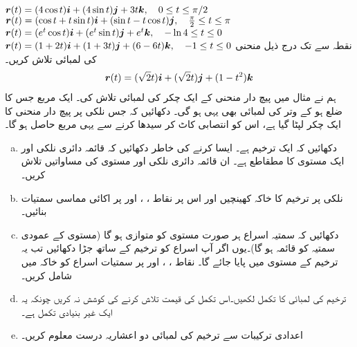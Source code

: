 ${{\boldsymbol{r}}}(t)=(4\cos t){\boldsymbol{i}}+(4\sin t){\boldsymbol{j}}+3t{\boldsymbol{k}},\quad 0\le t\le \pi/2$
${{\boldsymbol{r}}}(t)=(\cos t+t\sin t){\boldsymbol{i}}+(\sin t-t\cos t){\boldsymbol{j}},\quad \tfrac{\pi}{2}\le t\le \pi$
${{\boldsymbol{r}}}(t)=(e^t\cos t){\boldsymbol{i}}+(e^t\sin t){\boldsymbol{j}}+e^t{\boldsymbol{k}},\quad -\ln 4\le t\le 0$
${{\boldsymbol{r}}}(t)=(1+2t){\boldsymbol{i}}+(1+3t){\boldsymbol{j}}+(6-6t){\boldsymbol{k}},\quad -1\le t\le 0$
نقطہ   سے  تک درج  ذیل منحنی کی لمبائی تلاش کریں۔
\begin{align*}
{\ensuremath{{\boldsymbol{r}}}}(t)=(\sqrt{2}t){\boldsymbol{i}}+(\sqrt{2}t){\boldsymbol{j}}+(1-t^2){\boldsymbol{k}}
\end{align*}
ہم نے مثال  میں پیچ دار منحنی کے ایک چکر کی لمبائی  تلاش کی۔ ایک مربع جس  کا  ضلع  ہو  کے وتر کی لمبائی بھی یہی ہو گی۔ دکھائیں کہ جس نلکی پر پیچ دار منحنی کا ایک چکر  لپٹا   گیا ہے، اس کو انتصابی کاٹ کر سیدھا کرنے سے یہی مربع حاصل ہو گا۔
\begin{enumerate}[a.]
\item
دکھائیں کہ   ایک ترخیم ہے۔  ایسا کرنے کی خاطر دکھائیں کہ     قائمہ دائری نلکی اور  ایک مستوی کا مطقاطع  ہے۔ ان قائمہ دائری نلکی اور مستوی  کی مساواتیں تلاش کریں۔
\item
نلکی پر ترخیم کا خاکہ کھینچیں اور اس پر     نقاط ، ،  اور  پر  اکائی مماسی سمتیات بنائیں۔ 
\item
دکھائیں کہ سمتیہ اسراع ہر صورت مستوی کو متوازی ہو گا (مستوی کے عمودی سمتیہ کو قائمہ ہو گا)۔یوں اگر  آپ اسراع کو ترخیم کے ساتھ جڑا دکھائیں تب یہ ترخیم کے مستوی میں پایا جائے گا۔ نقاط ، ،  اور  پر سمتیات اسراع  کو خاکہ میں شامل کریں۔
\item
ترخیم کی لمبائی کا تکمل لکھیں۔اس تکمل کی قیمت تلاش کرنے کی کوشش نہ کریں چونکہ یہ ایک غیر بنیادی تکمل ہے۔
\item
اعدادی ترکیبات سے ترخیم کی لمبائی دو  اعشاریہ درست  معلوم کریں۔
\end{enumerate}

